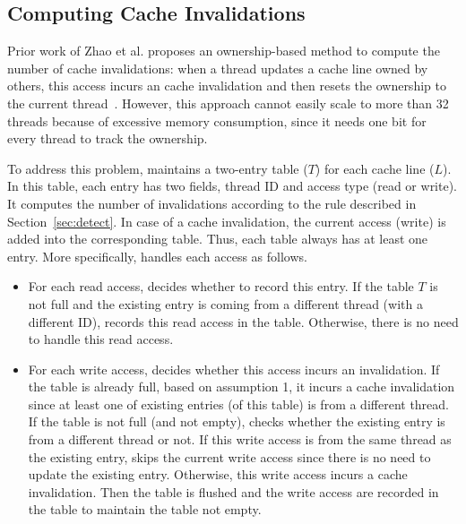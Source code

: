 \subsection{Computing Cache Invalidations}
\label{sec:computeinvalidations}

Prior work of Zhao et al. proposes an ownership-based method to compute the number of cache invalidations: when a thread updates a cache line owned by others, this access incurs an cache invalidation and then resets the ownership to the current thread~\cite{qinzhao}. However, this approach cannot easily scale to more than 32 threads because of excessive memory consumption, since it needs one bit for every thread to track the ownership.  

To address this problem, \Cheetah{} maintains a two-entry table ($T$) for each cache line ($L$). In this table, each entry has two fields, thread ID and access type (read or write). It computes the number of invalidations according to the rule described in Section~\ref{sec:detect}. In case of a cache invalidation, the current access (write) is added into the corresponding table. Thus, each table always has at least one entry. More specifically, \cheetah{} handles each access as follows.

\begin{itemize}
\item
For each read access, \cheetah{} decides whether to record this entry. If the table $T$ is not full and the existing entry is coming from a different thread (with a different ID), \cheetah{} records this read access in the table. Otherwise, there is no need to handle this read access. 
  
\item
For each write access, \cheetah{} decides whether this access incurs an invalidation. If the table is already full, based on assumption 1, it incurs a cache invalidation since at least one of existing entries (of this table) is from a different thread. If the table is not full (and not empty), \cheetah{} checks whether the existing entry is from a different thread or not. If this write access is from the same thread as the existing entry, \cheetah{} skips the current write access since there is no need to update the existing entry. Otherwise, this write access incurs a cache invalidation. Then the table is flushed and the write access are recorded in the table to maintain the table not empty.
  
\end{itemize}
     
